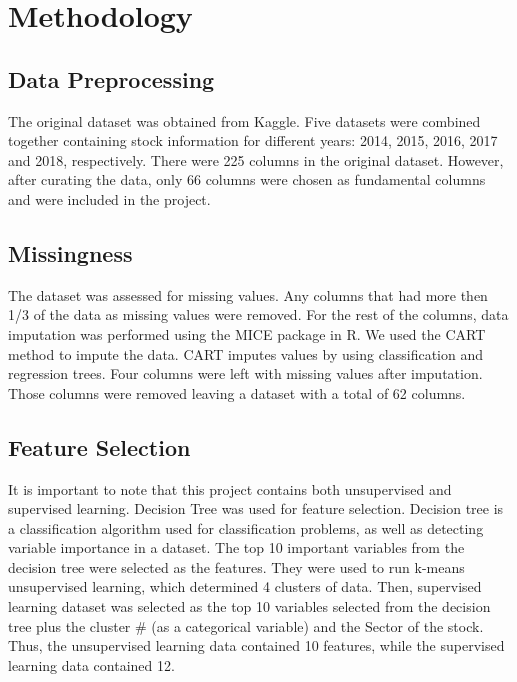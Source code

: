 \documentclass[11pt,]{article}
\begin{document}
\hypertarget{methodology}{%
\section{Methodology}\label{methodology}}

\hypertarget{data-preprocessing}{%
\subsection{Data Preprocessing}\label{data-preprocessing}}

The original dataset was obtained from Kaggle. Five datasets were
combined together containing stock information for different years:
2014, 2015, 2016, 2017 and 2018, respectively. There were 225 columns in
the original dataset. However, after curating the data, only 66 columns
were chosen as fundamental columns and were included in the project.

\hypertarget{missingness}{%
\subsection{Missingness}\label{missingness}}

The dataset was assessed for missing values. Any columns that had more
then 1/3 of the data as missing values were removed. For the rest of the
columns, data imputation was performed using the MICE package in R. We
used the CART method to impute the data. CART imputes values by using
classification and regression trees. Four columns were left with missing
values after imputation. Those columns were removed leaving a dataset
with a total of 62 columns.

\hypertarget{feature-selection}{%
\subsection{Feature Selection}\label{feature-selection}}

It is important to note that this project contains both unsupervised and
supervised learning. Decision Tree was used for feature selection.
Decision tree is a classification algorithm used for classification
problems, as well as detecting variable importance in a dataset. The top
10 important variables from the decision tree were selected as the
features. They were used to run k-means unsupervised learning, which
determined 4 clusters of data. Then, supervised learning dataset was
selected as the top 10 variables selected from the decision tree plus
the cluster \# (as a categorical variable) and the Sector of the stock.
Thus, the unsupervised learning data contained 10 features, while the
supervised learning data contained 12.
\end{document}

